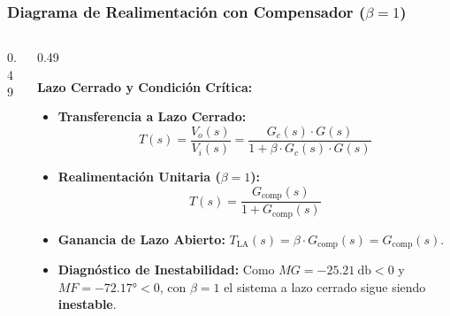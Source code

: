 \begin{frame}
  \frametitle{Diagrama de Realimentación con Compensador ($\beta = 1$)}

  \begin{columns}[c, onlytextwidth]
    \begin{column}{0.49\textwidth}
      \begin{tarjeta}[top=14pt, bottom=14pt]
        \centering
      \end{tarjeta}
    \end{column}

    \begin{column}{0.49\textwidth}
      \begin{tarjeta}[top=6pt, bottom=6pt]
        {\fontsize{8.5pt}{10.5pt}\selectfont \textbf{\color{NavyDark} Lazo Cerrado y Condición Crítica:}}\\[1pt]
        {\fontsize{7.2pt}{9pt}\selectfont
        \begin{itemize}\setlength{\itemsep}{1.5pt}
          \item \textbf{Transferencia a Lazo Cerrado:}
          \[ T(s) = \frac{V_o(s)}{V_i(s)} = \frac{G_c(s) \cdot G(s)}{1 + \beta \cdot G_c(s) \cdot G(s)} \]
          \item \textbf{Realimentación Unitaria ($\beta = 1$):}
          \[ T(s) = \frac{G_{\text{comp}}(s)}{1 + G_{\text{comp}}(s)} \]
          \item \textbf{Ganancia de Lazo Abierto:}
          $T_{\text{LA}}(s) = \beta \cdot G_{\text{comp}}(s) = G_{\text{comp}}(s)$.
          \item \textbf{Diagnóstico de Inestabilidad:}
          Como $MG = \qty{-25.21}{\decibel} < 0$ y $MF = \ang{-72.17} < 0$, con $\beta = 1$ el sistema a lazo cerrado sigue siendo \textbf{inestable}.
        \end{itemize}
        }
      \end{tarjeta}
    \end{column}
  \end{columns}
\end{frame}

